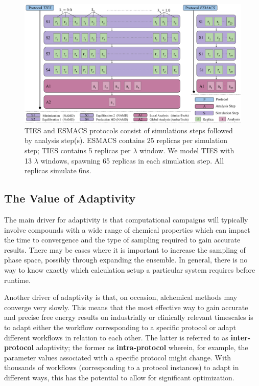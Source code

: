 \begin{figure}
  \centering
  \includegraphics[width=\columnwidth]{figures/ties_esmacs_application_model.pdf}
  \caption{TIES and ESMACS protocols consist of simulations steps followed by
  analysis step(s). ESMACS contains 25 replicas per simulation step; TIES
  contains 5 replicas per $\lambda$ window. We model TIES with 13 $\lambda$
  windows, spawning 65 replicas in each simulation step. All replicas
  simulate 6ns.}\label{fig:ties_esmacs_application}
\up{}
\up{}
\end{figure}

\subsection{The Value of Adaptivity}\label{ssec:adapt_ties}

The main driver for adaptivity is that computational campaigns will typically
involve compounds with a wide range of chemical properties which can impact
the time to convergence and the type of sampling required to gain accurate
results. There may be cases where it is important to increase the sampling of
phase space, possibly through expanding the ensemble. In general, there is no
way to know exactly which calculation setup a particular system requires
before runtime.

Another driver of adaptivity is that, on occasion, alchemical methods may
converge very slowly. This means that the most effective way to gain accurate
and precise free energy results on industrially or clinically relevant
timescales is to adapt either the workflow corresponding to a specific
protocol or adapt different workflows in relation to each other. The latter
is referred to as \textbf{inter-protocol} adaptivity; the former as
\textbf{intra-protocol} wherein, for example, the parameter values associated
with a specific protocol might change. With thousands of workflows
(corresponding to a protocol instances) to adapt in different ways, this has
the potential to allow for significant optimization.

